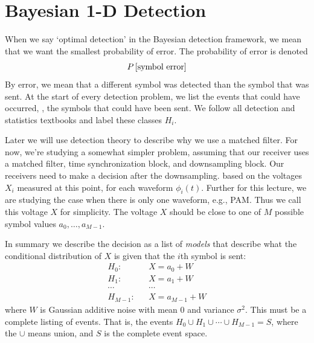 


\section{Bayesian 1-D Detection}

When we say `optimal detection' in the Bayesian detection framework,
we mean that we want the smallest probability of error.  The
probability of error is denoted
\[
  P\left[{\mbox{symbol error}}\right]
\]
By error, we mean that a different symbol was detected than the symbol
that was sent.   At the start of every detection problem, we list the
events that could have occurred, \ie, the symbols that could have
been sent. We follow all detection and statistics textbooks and label these classes $H_i$.

Later we will use detection theory to describe why we use a matched filter.  For now, we're studying a somewhat simpler problem, assuming that our receiver uses a matched filter, time synchronization block, and downsampling block.
Our receivers need to make a decision after the downsampling. based on the voltages $X_i$ measured at this point, for each waveform $\phi_i(t)$.  Further for this lecture, we are studying the case when there is only one waveform, e.g., PAM.  Thus we call this voltage $X$ for simplicity.  The voltage $X$ should be close to one of $M$ possible symbol values $a_0, \ldots, a_{M-1}$.  

In summary we describe the decision as a list of \emph{models} that describe what the conditional distribution of $X$ is given that the $i$th symbol is sent:
\begin{eqnarray}
  H_0: && X = a_0 + W \nonumber \\
  H_1: && X = a_1 + W \nonumber \\
  \cdots && \cdots \nonumber \\
  H_{M-1}: && X = a_{M-1} + W \nonumber
\end{eqnarray}
where $W$ is Gaussian additive noise with mean 0 and variance $\sigma^2$.
This must be a complete listing of events.  That is, the events $H_0
\cup H_1 \cup \cdots \cup H_{M-1} = S$, where the $\cup$ means
union, and $S$ is the complete event space.




